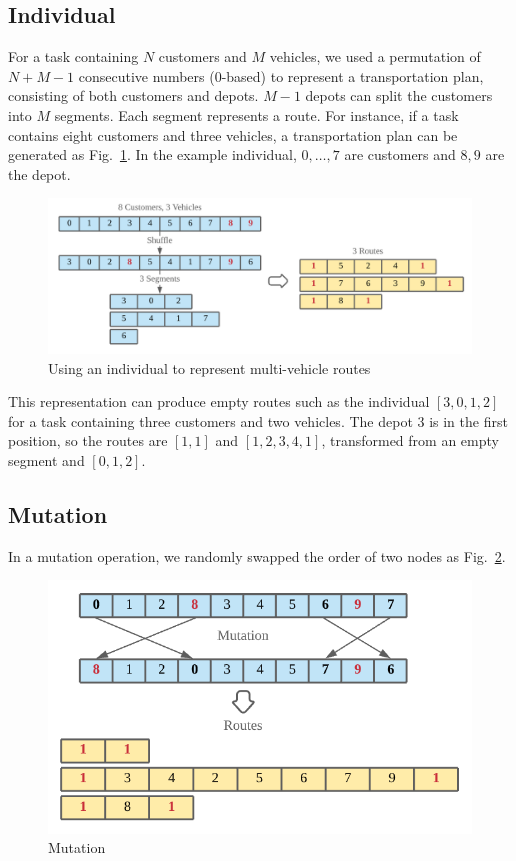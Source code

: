 \documentclass[runningheads]{llncs}
\begin{document}
\subsection{Individual}
For a task containing $N$ customers and $M$ vehicles, we used a permutation of $N + M - 1$ consecutive numbers (0-based) to represent a transportation plan, consisting of both customers and depots.
$M - 1$ depots can split the customers into $M$ segments. Each segment represents a route.
For instance, if a task contains eight customers and three vehicles, a transportation plan can be generated as Fig.~\ref{fig:individual}.
In the example individual, $0, \ldots, 7$ are customers and $8, 9$ are the depot.

\begin{figure}[htbp]
    \centerline{\includegraphics[width=\linewidth]{figures/individual.png}}
    \caption{Using an individual to represent multi-vehicle routes}
    \label{fig:individual}
\end{figure}

This representation can produce empty routes such as the individual $[3,0,1,2]$ for a task containing three customers and two vehicles.
The depot $3$ is in the first position, so the routes are $[1, 1]$ and $[1, 2, 3, 4, 1]$, transformed from an empty segment and $[0,1,2]$.

\subsection{Mutation}
In a mutation operation, we randomly swapped the order of two nodes as Fig.~\ref{fig:mutation}.

\begin{figure}[htbp]
    \centerline{\includegraphics[width=0.8\linewidth]{figures/mutation.png}}
    \caption{Mutation}
    \label{fig:mutation}
\end{figure}
\end{document}
